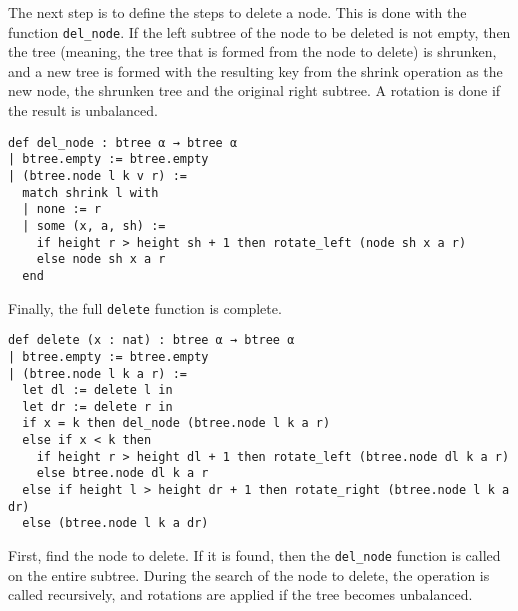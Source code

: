 The next step is to define the steps to delete a node. This is done with the function \lstinline{del_node}. If the left subtree of the node to be deleted is not empty, then the tree (meaning, the tree that is formed from the node to delete) is shrunken, and a new tree is formed with the resulting key from the shrink operation as the new node, the shrunken tree and the original right subtree. A rotation is done if the result is unbalanced. 

\begin{lstlisting}[caption=\empty]
def del_node : btree α → btree α
| btree.empty := btree.empty
| (btree.node l k v r) :=
  match shrink l with 
  | none := r
  | some (x, a, sh) :=
    if height r > height sh + 1 then rotate_left (node sh x a r)
    else node sh x a r
  end
\end{lstlisting}

Finally, the full \lstinline{delete} function is complete. 

\begin{lstlisting}[caption=\empty]
def delete (x : nat) : btree α → btree α
| btree.empty := btree.empty
| (btree.node l k a r) :=
  let dl := delete l in
  let dr := delete r in
  if x = k then del_node (btree.node l k a r)
  else if x < k then
    if height r > height dl + 1 then rotate_left (btree.node dl k a r)
    else btree.node dl k a r
  else if height l > height dr + 1 then rotate_right (btree.node l k a dr)
  else (btree.node l k a dr)
\end{lstlisting}

First, find the node to delete. If it is found, then the \lstinline{del_node} function is called on the entire subtree. During the search of the node to delete, the operation is called recursively, and rotations are applied if the tree becomes unbalanced. 